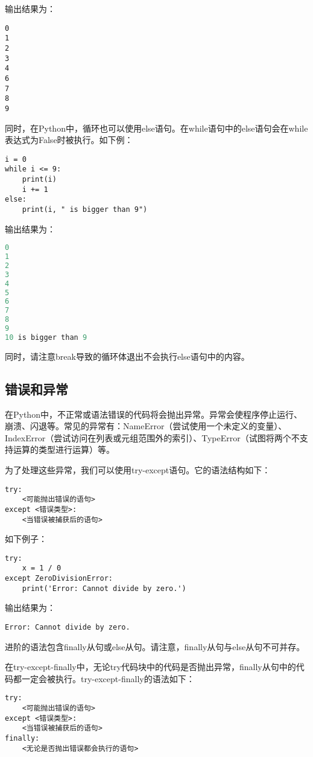输出结果为：
\begin{lstlisting}
0
1
2
3
4
6
7
8
9
\end{lstlisting}

同时，在Python中，循环也可以使用else语句。在while语句中的else语句会在while表达式为False时被执行。如下例：

\begin{lstlisting}
i = 0
while i <= 9:
    print(i)
    i += 1
else:
    print(i, " is bigger than 9")
\end{lstlisting}

输出结果为：
\begin{lstlisting}[language=C]
0
1
2
3
4
5
6
7
8
9
10 is bigger than 9
\end{lstlisting}

同时，请注意break导致的循环体退出不会执行else语句中的内容。

\subsection{错误和异常\PyOnly }
在Python中，不正常或语法错误的代码将会抛出异常。异常会使程序停止运行、崩溃、闪退等。常见的异常有：NameError（尝试使用一个未定义的变量）、IndexError（尝试访问在列表或元组范围外的索引）、TypeError（试图将两个不支持运算的类型进行运算）等。

为了处理这些异常，我们可以使用try-except语句。它的语法结构如下：
\begin{lstlisting}
try:
    <可能抛出错误的语句>
except <错误类型>:
    <当错误被捕获后的语句>
\end{lstlisting}

如下例子：

\begin{lstlisting}
try:
    x = 1 / 0
except ZeroDivisionError:
    print('Error: Cannot divide by zero.')
\end{lstlisting}

输出结果为：
\begin{lstlisting}
Error: Cannot divide by zero.
\end{lstlisting}

进阶的语法包含finally从句或else从句。请注意，finally从句与else从句不可并存。

在try-except-finally中，无论try代码块中的代码是否抛出异常，finally从句中的代码都一定会被执行。try-except-finally的语法如下：
\begin{lstlisting}
try:
    <可能抛出错误的语句>
except <错误类型>:
    <当错误被捕获后的语句>
finally:
    <无论是否抛出错误都会执行的语句>
\end{lstlisting}

